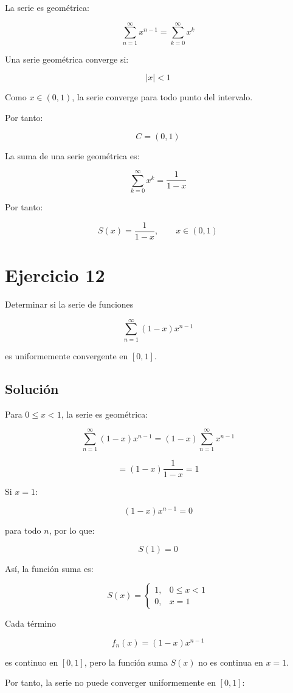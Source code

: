 \documentclass[fleqn]{article}
\begin{document}
	La serie es geométrica:

	\[
	\sum_{n=1}^{\infty}x^{n-1}
	=
	\sum_{k=0}^{\infty}x^k
	\]

	Una serie geométrica converge si:

	\[
	|x|<1
	\]

	Como $x\in(0,1)$, la serie converge para todo punto del intervalo.

	Por tanto:

	\[
	\boxed{
	C=(0,1)
	}
	\]

	La suma de una serie geométrica es:

	\[
	\sum_{k=0}^{\infty}x^k
	=
	\frac{1}{1-x}
	\]

	Por tanto:

	\[
	\boxed{
	S(x)=\frac{1}{1-x},
	\qquad x\in(0,1)
	}
	\]

\section{Ejercicio 12}
	Determinar si la serie de funciones

	\[
	\sum_{n=1}^{\infty}(1-x)x^{n-1}
	\]

	es uniformemente convergente en $[0,1]$.

	\subsection{Solución}

	Para $0\leq x<1$, la serie es geométrica:

	\[
	\sum_{n=1}^{\infty}(1-x)x^{n-1}
	=
	(1-x)\sum_{n=1}^{\infty}x^{n-1}
	\]

	\[
	=
	(1-x)\frac{1}{1-x}
	=
	1
	\]

	Si $x=1$:

	\[
	(1-x)x^{n-1}=0
	\]

	para todo $n$, por lo que:

	\[
	S(1)=0
	\]

	Así, la función suma es:

	\[
	S(x)=
	\begin{cases}
	1, & 0\leq x<1 \\[1mm]
	0, & x=1
	\end{cases}
	\]

	Cada término

	\[
	f_n(x)=(1-x)x^{n-1}
	\]

	es continuo en $[0,1]$, pero la función suma $S(x)$ no es continua en $x=1$.

	Por tanto, la serie no puede converger uniformemente en $[0,1]$:
\end{document}
